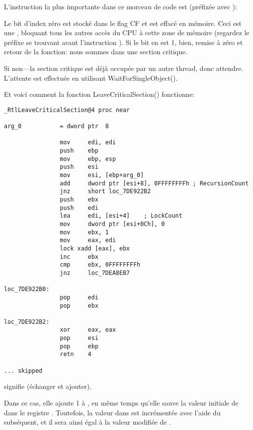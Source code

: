 
L'instruction la plus importante dans ce morceau de code est  (préfixée avec ):

Le bit d'index zéro est stocké dans le flag CF et est effacé en mémoire.
Ceci est une , bloquant tous les autres
accès du CPU à cette zone de mémoire (regardez le préfixe  se trouvant avant
l'instruction ). Si le bit en  est 1,
bien, remise à zéro et retour de la fonction: nous sommes dans une section critique.

Si non---la section critique est déjà occupée par un autre thread, donc attendre.
L'attente est effectuée en utilisant WaitForSingleObject().

Et voici comment la fonction LeaveCriticalSection() fonctionne:

\begin{lstlisting}[caption=Windows 2008/ntdll.dll/x86 (begin),style=customasmx86]
_RtlLeaveCriticalSection@4 proc near

arg_0           = dword ptr  8

                mov     edi, edi
                push    ebp
                mov     ebp, esp
                push    esi
                mov     esi, [ebp+arg_0]
                add     dword ptr [esi+8], 0FFFFFFFFh ; RecursionCount
                jnz     short loc_7DE922B2
                push    ebx
                push    edi
                lea     edi, [esi+4]    ; LockCount
                mov     dword ptr [esi+0Ch], 0
                mov     ebx, 1
                mov     eax, edi
                lock xadd [eax], ebx
                inc     ebx
                cmp     ebx, 0FFFFFFFFh
                jnz     loc_7DEA8EB7

loc_7DE922B0:
                pop     edi
                pop     ebx

loc_7DE922B2:
                xor     eax, eax
                pop     esi
                pop     ebp
                retn    4

... skipped
\end{lstlisting}

 signifie  (échanger et ajouter).

Dans ce cas, elle ajoute 1 à , en même temps qu'elle sauve la valeur
initiale de  dans le registre .
Toutefois, la valeur dans  est incrémentée avec l'aide du  subséquent,
et il sera ainsi égal à la valeur modifiée de .


